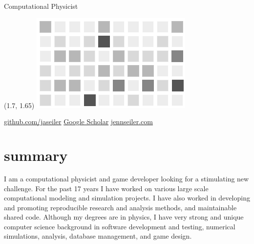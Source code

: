 \documentclass[]{seiler-resume}
\begin{document}
       {Computational Physicist}
 \begin{textblock}{3.6}(1.7, 1.65)
 \includegraphics[scale=0.5]{gitview2}
 \end{textblock}
\begin{emailphone}
\href{https://github.com/jaseiler}{github.com/jaseiler}
\href{https://scholar.google.com/citations?user=I9vG6PAAAAAJ}{Google Scholar}
\href{http://jennseiler.com}{jennseiler.com}
\end{emailphone}
\section{summary}
I am a computational physicist and game developer looking for a stimulating new challenge. For the past 17 years I have worked on various large scale computational modeling and simulation projects. I have also worked in developing and promoting reproducible research and analysis methods, and maintainable shared code. Although my degrees are in physics, I have very strong and unique computer science background in software development and testing, numerical simulations, analysis, database management, and game design.
\end{document}
